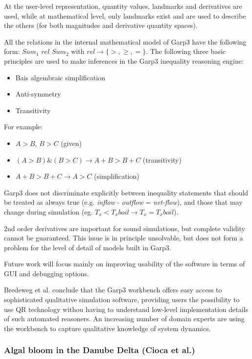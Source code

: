 \documentclass{article} %
\begin{document}
At the user-level representation, quantity values, landmarks and derivatives are
used, while at mathematical level, only landmarks exist and are used to
describe the others (for both magnitudes and derivative quantity spaces).

All the relations in the internal mathematical model of Garp3 have the
following form: $Sum_1$ $rel$ $Sum_2$ with $rel \rightarrow \{>,\ge,=\}$. The following
three basic principles are used to make inferences in the Garp3 inequality
reasoning engine:

\begin{itemize}
\item Bais algembraic simplification
\item Anti-symmetry
\item Transitivity
\end{itemize}
For example:
\begin{itemize}
\item $A>B$, $B>C$ (given)
\item $(A>B)\&(B>C) \rightarrow A+B>B+C$ (transitivity)
\item $A+B>B+C \rightarrow A>C$ (simplification)
\end{itemize}

Garp3 does not discriminate explicitly between inequality statements that
should be treated as always true (e.g. \emph{inflow} - \emph{outflow} = 
\emph{net-flow}), and those that may change during simulation 
(eg. $T_x < T_xboil \rightarrow T_x = T_xboil$).

\vspace{0.8em}

2nd order derivatives are important for sound simulations, but complete
validity cannot be guaranteed. This issue is in principle unsolvable, but does
not form a problem for the level of detail of models built in Garp3.  

Future work will focus mainly on improving usability of the software in terms
of GUI and debugging options.

Bredeweg et al. conclude that the Garp3 workbench offers easy access to 
sophisticated qualitative simulation software, providing users the 
possibility to use QR technology withou having to understand low-level 
implementation details of such automated reasoners. An increasing number of 
domain experts are using the workbench to capture qualitative knowledge of 
system dynamics.  

\subsubsection{Algal bloom in the Danube Delta (Cioca et al.)}
\end{document}
